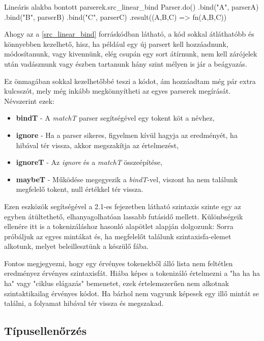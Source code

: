 \begin{code}{Lineáris alakba bontott parserek.}{src_linear_bind}
Parser.do()
    .bind("A", parserA)
    .bind("B", parserB)
    .bind("C", parserC)
    .result(({A,B,C}) => fn(A,B,C))
\end{code}

Ahogy az a \ref{src_linear_bind} forráskódban látható, a kód sokkal átláthatóbb és könnyebben kezelhető, hisz, ha például egy új parsert kell hozzáadnunk, módosítanunk, vagy kivennünk, elég csupán egy sort átírnunk, nem kell zárójelek után vadásznunk vagy észben tartanunk hány szint mélyen is jár a beágyazás. 

Ez önmagában sokkal kezelhetőbbé teszi a kódot, ám hozzáadtam még pár extra kulcsszót, mely még inkább megkönnyítheti az egyes parserek megírását. Névszerint ezek:

\begin{itemize}
    \item \textbf{bindT} - A \textit{matchT} parser segítségével egy tokent köt a névhez,
    \item \textbf{ignore} - Ha a parser sikeres, figyelmen kívül hagyja az eredményét, ha hibával tér vissza, akkor megszakítja az értelmezést,
    \item \textbf{ignoreT} - Az \textit{ignore} és a \textit{matchT} összeépítése,
    \item \textbf{maybeT} - Működése megegyezik a \textit{bindT}-vel, viszont ha nem találunk megfelelő tokent, null értékkel tér vissza.
\end{itemize}

Ezen eszközök segítségével a 2.1-es fejezetben látható szintaxis szinte egy az egyben átültethető, elhanyagolhatóan lassabb futásidő mellett. Különbségeik ellenére itt is a  tokenizáláshoz hasonló alapötlet alapján dolgozunk: Sorra próbáljuk az egyes mintákat és, ha megfelelőt találunk szintaxisfa-elemet alkotunk, melyet beleillesztünk a készülő fába.

Fontos megjegyezni, hogy egy érvényes tokenekből álló lista nem feltétlen eredményez érvényes szintaxisfát. Hiába képes a tokenizáló értelmezni a "ha ha ha ha" vagy "ciklus elágazás" bemenetet, ezek értelemszerűen nem alkotnak szintaktikailag érvényes kódot. Ha bárhol nem vagyunk képesek egy illő mintát se találni, a folyamat hibával tér vissza és megszakad.

\subsection{Típusellenőrzés}
\label{sec:typecheck}

